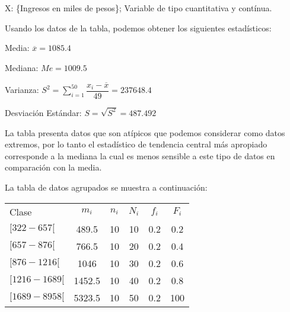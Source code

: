 \begin{solution}
X: \{Ingresos en miles de pesos\}; Variable de tipo cuantitativa y contínua.

Usando los datos de la tabla, podemos obtener los siguientes estadísticos:

Media: $\overline{x}=1085.4$

Mediana: $Me=1009.5$

Varianza: $S^2 = \sum_{i=1}^{50} \dfrac{x_i - \overline{x}}{49}= 237648.4$

Desviación Estándar: $S=\sqrt{S^2}=487.492$

La tabla presenta datos que son atípicos que podemos considerar como datos extremos, por lo tanto el estadístico de tendencia central más apropiado corresponde a la mediana la cual es menos sensible a este tipo de datos en comparación con la media.

La tabla de datos agrupados se muestra a continuación:


\begin{center}
\begin{tabular}{lccccc}
Clase           & $m_i$  & $n_i$ & $N_i$ & $f_i$ & $F_i$ \\
$[322 - 657[$   & 489.5  & 10    & 10    & 0.2   & 0.2   \\
$[657 - 876[$   & 766.5  & 10    & 20    & 0.2   & 0.4   \\
$[876 - 1216[$  & 1046   & 10    & 30    & 0.2   & 0.6   \\
$[1216 - 1689[$ & 1452.5 & 10    & 40    & 0.2   & 0.8   \\
$[1689 - 8958[$ & 5323.5 & 10    & 50    & 0.2   & 100  
\end{tabular}
\end{center}

\end{solution}